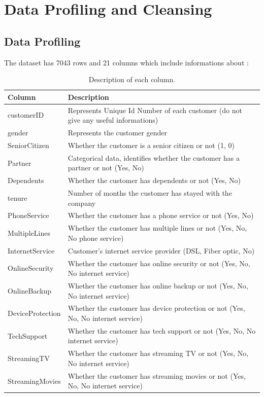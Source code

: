 \section{Data Profiling and Cleansing}
\subsection{Data Profiling}

The dataset has 7043 rows and 21 columns which include informations about :
\begin{longtable}{p{}p{}}
\caption{Description of each column.}
\label{tab:columndesc}
\endfirsthead
\hline
Column & Description\\ \hline
customerID & Represents Unique Id Number of each customer (do not give any useful informations) \\
gender & Represents the customer gender \\
SeniorCitizen & Whether the customer is a senior citizen or not (1, 0) \\
Partner & Categorical data, identifies whether the customer has a partner or not (Yes, No)\\
Dependents & Whether the customer has dependents or not (Yes, No) \\
tenure & Number of months the customer has stayed with the company\\
PhoneService & Whether the customer has a phone service or not (Yes, No)\\
MultipleLines & Whether the customer has multiple lines or not (Yes, No, No phone service)\\
InternetService & Customer’s internet service provider (DSL, Fiber optic, No)\\
OnlineSecurity & Whether the customer has online security or not (Yes, No, No internet service)\\
OnlineBackup & Whether the customer has online backup or not (Yes, No, No internet service)\\
DeviceProtection & Whether the customer has device protection or not (Yes, No, No internet service)\\
TechSupport & Whether the customer has tech support or not (Yes, No, No internet service)\\
StreamingTV & Whether the customer has streaming TV or not (Yes, No, No internet service)\\
 StreamingMovies & Whether the customer has streaming movies or not (Yes, No, No internet service)\\

\end{longtable}

